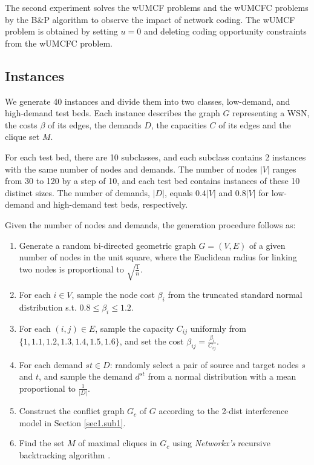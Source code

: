 The second experiment solves the wUMCF problems and the wUMCFC problems by the B\(\&\)P algorithm to observe the impact of network coding.
The wUMCF problem is obtained by setting \(u = 0\) and deleting coding opportunity constraints from the wUMCFC problem. 

\subsection{Instances}
We generate 40 instances and divide them into two classes, low-demand, and high-demand test beds. Each instance describes the graph \(G\) representing a WSN, the costs \(\beta\) of its edges, the demands \(D\), the capacities \(C\) of its edges and the clique set \(M\).

For each test bed, there are 10 subclasses, and each subclass contains 2 instances with the same number of nodes and demands. The number of nodes \(|V|\) ranges from 30 to 120 by a step of 10, and each test bed contains instances of these 10 distinct sizes.  
The number of demands, \(|D|\), equals \(0.4|V|\) and \(0.8|V|\) for low-demand and high-demand test beds, respectively.

Given the number of nodes and demands, the generation procedure follows as:

\begin{enumerate}
    \item Generate a random bi-directed geometric graph \(G=(V, E)\) of a given number of nodes in the unit square, where the Euclidean radius for linking two nodes is proportional to \(\sqrt{\frac{1}{n}}\).
    \item For each \(i \in V\), sample the node cost \(\beta_i\) from the truncated standard normal distribution s.t. \(0.8 \le \beta_i \le 1.2\).
    \item For each \((i,j) \in E\), sample the capacity \(C_{ij}\) uniformly from \(\{1, 1.1, 1.2, 1.3, 1.4, 1.5, 1.6\}\), and set the cost \(\beta_{ij} = \frac{\beta_i}{C_{ij}}\).
    \item For each demand \(st \in D\): randomly select a pair of source and target nodes \(s\) and  \(t\), and sample the demand \(d^{st}\) from a normal distribution with a mean proportional to \(\frac{1}{|D|}\).
    \item Construct the conflict graph \(G_c\) of \(G\) according to the 2-dist interference model in Section \ref{sec1.sub1}.
    \item Find the set \(M\) of maximal cliques in \(G_c\) using \textit{Networkx's} recursive backtracking algorithm \cite{hagberg2008exploring}.
\end{enumerate}

